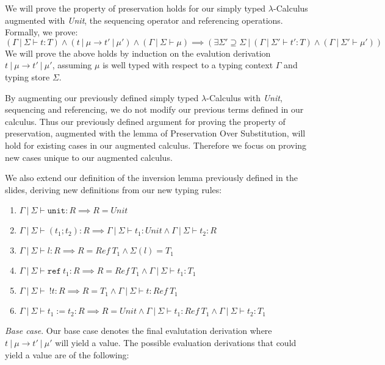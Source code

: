 \documentclass[12pt, fleqn]{article}
\begin{document}
We will prove the property of preservation holds for our simply typed $\lambda$-Calculus augmented with \emph{Unit}, the sequencing operator and referencing operations. Formally, we prove:
$$
    (\Gamma\:|\:\Sigma \vdash t : T) \land (t\:|\:\mu \rightarrow t'\:|\:\mu') \land (\Gamma\:|\:\Sigma \vdash \mu) \implies
    (\exists \Sigma' \supseteq \Sigma\:|\: (\Gamma\:|\:\Sigma' \vdash t' : T) \land (\Gamma\:|\:\Sigma' \vdash \mu'))
$$
We will prove the above holds by induction on the evalution derivation $t\:|\:\mu \rightarrow t'\:|\:\mu'$, assuming $\mu$ is well typed with respect to a typing context $\Gamma$ and typing store $\Sigma$.

\medskip
By augmenting our previously defined simply typed $\lambda$-Calculus with \emph{Unit}, sequencing and referencing,  we do not modify our previous terms defined in our calculus. Thus our previously defined argument for proving the property of preservation, augmented with the lemma of Preservation Over Substitution, will hold for existing cases in our augmented calculus. Therefore we focus on proving new cases unique to our augmented calculus.

\medskip
We also extend our definition of the inversion lemma previously defined in the slides, deriving new definitions from our new typing rules:
\begin{enumerate}[(1)]
    \item $\Gamma\:|\:\Sigma \vdash \texttt{unit} : R \implies R = Unit$
    \item $\Gamma\:|\:\Sigma \vdash (t_1 ; t_2) : R \implies \Gamma\:|\:\Sigma \vdash t_1 : Unit \land \Gamma\:|\:\Sigma \vdash t_2 : R$
    \item $\Gamma\:|\:\Sigma \vdash l : R \implies R = Ref\:T_1 \land \Sigma(l) = T_1$
    \item $\Gamma\:|\:\Sigma \vdash \texttt{ref}\:t_1 : R \implies R = Ref\:T_1 \land \Gamma\:|\:\Sigma \vdash t_1 : T_1$
    \item $\Gamma\:|\:\Sigma \vdash\:!t : R \implies R = T_1 \land \Gamma\:|\:\Sigma \vdash t : Ref \: T_1$
    \item $\Gamma\:|\:\Sigma \vdash t_1 := t_2 : R \implies R = Unit \land \Gamma\:|\:\Sigma \vdash t_1 : Ref \: T_1 \land \Gamma\:|\:\Sigma \vdash t_2 : T_1$
\end{enumerate}

\emph{Base case}. Our base case denotes the final evalutation derivation where $t\:|\:\mu \rightarrow t'\:|\:\mu'$ will yield a value. The possible evaluation derivations that could yield a value are of the following:
\end{document}
